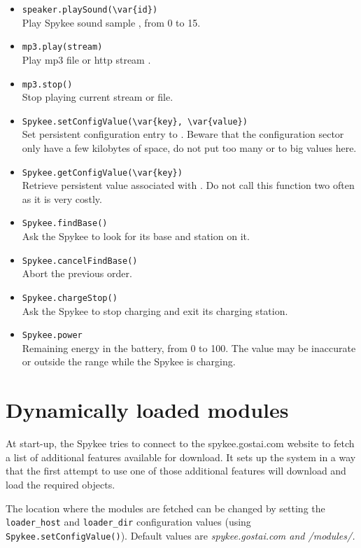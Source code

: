 \begin{itemize}
\item \lstinline|speaker.playSound(\var{id})| \\
  Play Spykee sound sample , from 0 to 15.
\item \lstinline|mp3.play(stream)| \\
  Play mp3 file or http stream .
\item \lstinline|mp3.stop()| \\
  Stop playing current stream or file.
\item \lstinline|Spykee.setConfigValue(\var{key}, \var{value})| \\
  Set persistent configuration entry  to . Beware that
  the configuration sector only have a few kilobytes of space, do not put
  too many or to big values here.
\item \lstinline|Spykee.getConfigValue(\var{key})| \\
  Retrieve persistent value associated with . Do not call this
  function two often as it is very costly.
\item \lstinline|Spykee.findBase()| \\
  Ask the Spykee to look for its base and station on it.
\item \lstinline|Spykee.cancelFindBase()| \\
  Abort the previous order.
\item \lstinline|Spykee.chargeStop()| \\
  Ask the Spykee to stop charging and exit its charging station.
\item \lstinline|Spykee.power| \\
  Remaining energy in the battery, from 0 to 100. The value may be
  inaccurate or outside the range while the Spykee is charging.
\end{itemize}

\section{Dynamically loaded modules}
At start-up, the Spykee tries to connect to the spykee.gostai.com website to
fetch a list of additional features available for download.  It sets up the
system in a way that the first attempt to use one of those additional
features will download and load the required objects.

The location where the modules are fetched can be changed by setting the
\lstinline|loader_host| and \lstinline|loader_dir| configuration values
(using \lstinline|Spykee.setConfigValue()|).  Default values are
\em{spykee.gostai.com} and \em{/modules/}.

